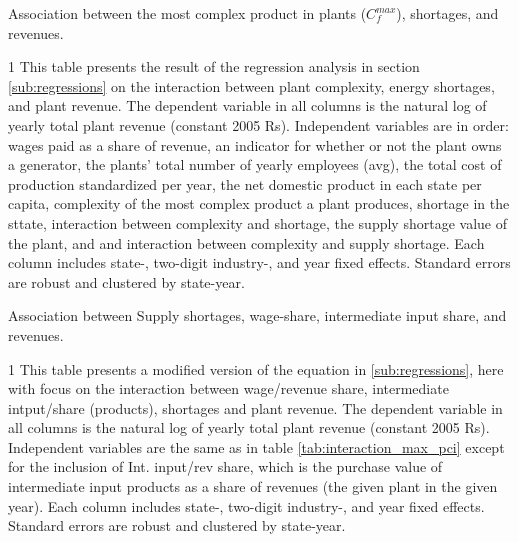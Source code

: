 \documentclass[11pt]{article}
\begin{document}
\begin{sidewaystable}
	\begin{center}
		\begin{threeparttable}
		\caption{Association between the most complex product in plants ($C^{max}_{f}$), shortages, and revenues.}
			\label{tab:interaction_max_pci}
			
			\begin{tablenotes} \footnotesize
			\item[1] This table presents the result of the regression analysis in section \ref{sub:regressions} on the interaction between plant complexity, energy shortages, and plant revenue. The dependent variable in all columns is the natural log of yearly total plant revenue (constant 2005 Rs). Independent variables are in order: wages paid as a share of revenue, an indicator for whether or not the plant owns a generator, the plants' total number of yearly employees (avg), the total cost of production standardized per year, the net domestic product in each state per capita, complexity of the most complex product a plant produces, shortage in the sttate, interaction between complexity and shortage, the supply shortage value of the plant, and and interaction between complexity and supply shortage. Each column includes state-, two-digit industry-, and year fixed effects. Standard errors are robust and clustered by state-year.
			\end{tablenotes}
		\end{threeparttable}
	\end{center}
\end{sidewaystable}


\begin{table}
	\begin{center}
		\begin{threeparttable}
		\caption{Association between Supply shortages, wage-share, intermediate input share, and revenues.}
			\label{tab:interaction_wage_input}
			
			\begin{tablenotes} \footnotesize
			\item[1] This table presents a modified version of the equation in \ref{sub:regressions}, here with focus on the interaction between wage/revenue share, intermediate intput/share (products), shortages and plant revenue. The dependent variable in all columns is the natural log of yearly total plant revenue (constant 2005 Rs). Independent variables are the same as in table \ref{tab:interaction_max_pci} except for the inclusion of Int. input/rev share, which is the purchase value of intermediate input products as a share of revenues (the given plant in the given year). Each column includes state-, two-digit industry-, and year fixed effects. Standard errors are robust and clustered by state-year.
			\end{tablenotes}
		\end{threeparttable}
	\end{center}
\end{table}
\end{document}
